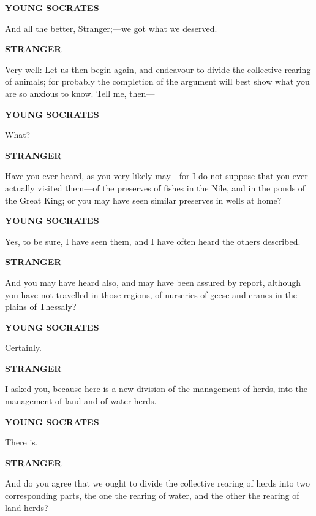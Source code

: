 \documentclass[11pt,letter]{article}
\begin{document}
\par \textbf{YOUNG SOCRATES}
\par   And all the better, Stranger;—we got what we deserved.

\par \textbf{STRANGER}
\par   Very well:  Let us then begin again, and endeavour to divide the collective rearing of animals; for probably the completion of the argument will best show what you are so anxious to know. Tell me, then—

\par \textbf{YOUNG SOCRATES}
\par   What?

\par \textbf{STRANGER}
\par   Have you ever heard, as you very likely may—for I do not suppose that you ever actually visited them—of the preserves of fishes in the Nile, and in the ponds of the Great King; or you may have seen similar preserves in wells at home?

\par \textbf{YOUNG SOCRATES}
\par   Yes, to be sure, I have seen them, and I have often heard the others described.

\par \textbf{STRANGER}
\par   And you may have heard also, and may have been assured by report, although you have not travelled in those regions, of nurseries of geese and cranes in the plains of Thessaly?

\par \textbf{YOUNG SOCRATES}
\par   Certainly.

\par \textbf{STRANGER}
\par   I asked you, because here is a new division of the management of herds, into the management of land and of water herds.

\par \textbf{YOUNG SOCRATES}
\par   There is.

\par \textbf{STRANGER}
\par   And do you agree that we ought to divide the collective rearing of herds into two corresponding parts, the one the rearing of water, and the other the rearing of land herds?
\end{document}
